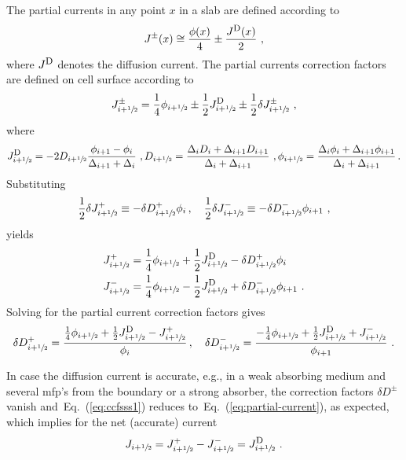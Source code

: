 \documentclass[letterpaper]{physor2020}
\newcommand{\eq}[1]{Eq.~(\ref{#1})}
\newcommand{\jp}{\ensuremath{J^+}}
\newcommand{\jm}{\ensuremath{J^-}}
\newcommand{\jpm}{\ensuremath{J^\pm}}
\newcommand{\jD}{\ensuremath{J^{\textrm{\scriptsize{D}}}}}
\newcommand{\hzi}{\ensuremath{\sfrac{1}{2}}}
\begin{document}
The partial currents in any point $x$ in a slab are defined according to
\begin{equation}
\label{eq:partial-current}
\jpm (x) \cong \frac{\phi(x)}{4} \pm \frac{\jD (x)}{2} \,\, ,
\end{equation}
where $\jD$ denotes the diffusion current.
The partial currents correction factors are defined on cell surface according to
\begin{equation}
\label{eq:PCCF}
\jpm _{i+\hzi} = \frac{1}{4}\phi_{i+\hzi}
\pm \frac{1}{2} \jD _{i+\hzi} \pm \frac{1}{2} \delta \jpm _{i+\hzi} \,\, ,
\end{equation}
where
\begin{equation}
\label{eq:jdiff}
\jD _{i+\hzi} = - 2 D_{i+\hzi} \frac{\phi_{i+1} - \phi_i}{\Delta_{i+1}+\Delta_i} 
\,\,, %
D_{i+\hzi} = \frac{\Delta_i D_i + \Delta_{i+1} D_{i+1}}{\Delta_i + \Delta_{i+1}} 
\,\,, %
\phi_{i+\hzi} = \frac{\Delta_i \phi_i + \Delta_{i+1} \phi_{i+1}}{\Delta_i + \Delta_{i+1}} \, .
\end{equation}
Substituting~\cite{Jarrett-2016,Zhu-2016}
\begin{equation}
\label{eq:CCF-sub}
\frac{1}{2} \delta \jp _{i+\hzi} \equiv -\delta D^+ _{i+\hzi} \phi_i \,, 
\quad
\frac{1}{2} \delta \jm _{i+\hzi} \equiv -\delta D^- _{i+\hzi} \phi_{i+1}\,\, ,
\end{equation}
yields
\begin{align}
\label{eq:par4}
\jp _{i+\hzi} &= \frac{1}{4}\phi_{i+\hzi}
+ \frac{1}{2}\jD _{i+\hzi} - \delta D^+ _{i+\hzi} \phi_i \\
\jm _{i+\hzi} &= \frac{1}{4}\phi_{i+\hzi}
- \frac{1}{2}\jD _{i+\hzi} + \delta D^- _{i+\hzi} \phi_{i+1} \,\, .
\end{align}
%
Solving for the partial current correction factors gives
\begin{equation}
\label{eq:ccfsss1}
\delta D^+ _{i+\hzi} = \frac{\frac{1}{4}\phi_{i+\hzi}
	+ \frac{1}{2}\jD _{i+\hzi} - \jp _{i+\hzi}}{\phi_i} \,, \quad
\delta D^- _{i+\hzi} = \frac{-\frac{1}{4}\phi_{i+\hzi}
	+ \frac{1}{2}\jD _{i+\hzi} + \jm _{i+\hzi}}{\phi_{i+1}} \,\, .
\end{equation}

In case the diffusion current is accurate, e.g., in a weak absorbing medium and several mfp's from the boundary or a strong absorber, the correction factors $\delta D^\pm$ vanish and~\eq{eq:ccfsss1} reduces to~\eq{eq:partial-current}, as expected, which implies for the net (accurate) current 
\begin{equation}
J _{i+\hzi} = \jp _{i+\hzi} - \jm _{i+\hzi} = \jD _{i+\hzi} \,\, .
\end{equation} 
\end{document}
